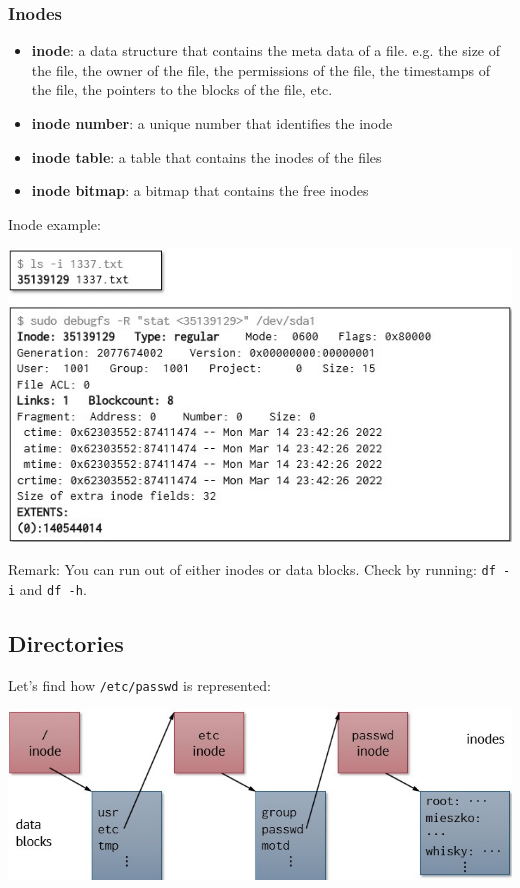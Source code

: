 \documentclass[letterpaper,12pt]{article}
\begin{document}
\subsubsection{Inodes}
\begin{itemize}
    \item \textbf{inode}: a data structure that contains the meta data of a file. e.g. the size of the file, the owner of the file, the permissions of the file, the timestamps of the file, the pointers to the blocks of the file, etc.
    \item \textbf{inode number}: a unique number that identifies the inode
    \item \textbf{inode table}: a table that contains the inodes of the files
    \item \textbf{inode bitmap}: a bitmap that contains the free inodes
\end{itemize}
Inode example: 

\includegraphics*[scale = 0.7]{./Images/Inode example.jpg}

Remark: You can run out of either inodes or data blocks. Check by running: \texttt{df -i} and \texttt{df -h}.
\subsection{Directories}
Let's find how \texttt{/etc/passwd} is represented:

\includegraphics*[scale= 0.6]{./Images/Directory representation.jpg}
\end{document}
